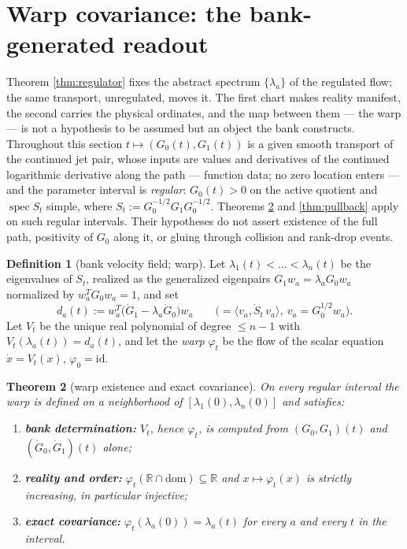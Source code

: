 \documentclass[11pt]{article}
\theoremstyle{plain}
\newtheorem{theorem}{Theorem}
\theoremstyle{definition}
\newtheorem{definition}[theorem]{Definition}
\theoremstyle{remark}
\newcommand{\R}{\mathbb{R}}
\DeclareMathOperator{\spec}{spec}
\begin{document}
\section{Warp covariance: the bank-generated readout}\label{sec:warp}

Theorem \ref{thm:regulator} fixes the abstract spectrum $\{\lambda_a\}$ of the regulated
flow; the same transport, unregulated, moves it. The first chart makes reality manifest,
the second carries the physical ordinates, and the map between them --- the warp --- is
not a hypothesis to be assumed but an object the bank constructs. Throughout this
section $t\mapsto(G_0(t),G_1(t))$ is a given smooth transport of the continued jet pair, whose
inputs are values and derivatives of the continued logarithmic derivative along the path
--- function data; no zero location enters --- and the parameter interval is
\emph{regular}: $G_0(t)>0$ on the active quotient and $\spec S_t$ simple, where
$S_t:=G_0^{-1/2}G_1G_0^{-1/2}$. Theorems \ref{thm:warp} and \ref{thm:pullback}
apply on such regular intervals. Their hypotheses do not assert existence of the full
path, positivity of $G_0$ along it, or gluing through collision and rank-drop events.

\begin{definition}[bank velocity field; warp]\label{def:warp}
Let $\lambda_1(t)<\dots<\lambda_n(t)$ be the eigenvalues of $S_t$, realized as the
generalized eigenpairs $G_1w_a=\lambda_aG_0w_a$ normalized by $w_a^{T}G_0w_a=1$, and set
\[
  d_a(t) := w_a^{T}\bigl(\dot G_1-\lambda_a\dot G_0\bigr)w_a
  \qquad\bigl(=\langle v_a,\dot S_t\,v_a\rangle,\ v_a=G_0^{1/2}w_a\bigr).
\]
Let $V_t$ be the unique real polynomial of degree $\le n-1$ with
$V_t(\lambda_a(t))=d_a(t)$, and let the \emph{warp} $\varphi_t$ be the flow of the
scalar equation $\dot x=V_t(x)$, $\varphi_0=\mathrm{id}$.
\end{definition}

\begin{theorem}[warp existence and exact covariance]\label{thm:warp}
On every regular interval the warp is defined on a neighborhood of
$[\lambda_1(0),\lambda_n(0)]$ and satisfies:
\begin{enumerate}
\item[(i)] \textbf{bank determination:} $V_t$, hence $\varphi_t$, is computed from
$(G_0,G_1)(t)$ and $(\dot G_0,\dot G_1)(t)$ alone;
\item[(ii)] \textbf{reality and order:} $\varphi_t(\R\cap\mathrm{dom})\subseteq\R$ and
$x\mapsto\varphi_t(x)$ is strictly increasing, in particular injective;
\item[(iii)] \textbf{exact covariance:} $\varphi_t(\lambda_a(0))=\lambda_a(t)$ for
every $a$ and every $t$ in the interval.
\end{enumerate}
\end{theorem}
\end{document}
